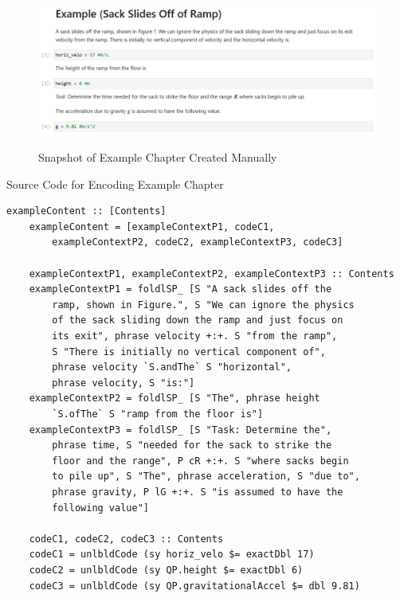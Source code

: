 \begin{figure}[h!]
	\caption{Snapshot of Example Chapter Created Manually}
	\includegraphics[width=1\textwidth]{figures/example_manual.png}
	\label{fig:example_manual}
\end{figure}

\begin{listing}[h!]
	\caption{Source Code for Encoding Example Chapter}
	\label{code:encodeExample}
	\begin{lstlisting}[language=haskell1]
	exampleContent :: [Contents]
	exampleContent = [exampleContextP1, codeC1, 
		exampleContextP2, codeC2, exampleContextP3, codeC3]
		
	exampleContextP1, exampleContextP2, exampleContextP3 :: Contents
	exampleContextP1 = foldlSP_ [S "A sack slides off the
		ramp, shown in Figure.", S "We can ignore the physics 
		of the sack sliding down the ramp and just focus on 
		its exit", phrase velocity +:+. S "from the ramp",
		S "There is initially no vertical component of", 
		phrase velocity `S.andThe` S "horizontal", 
		phrase velocity, S "is:"]
	exampleContextP2 = foldlSP_ [S "The", phrase height 
		`S.ofThe` S "ramp from the floor is"]
	exampleContextP3 = foldlSP_ [S "Task: Determine the", 
		phrase time, S "needed for the sack to strike the 
		floor and the range", P cR +:+. S "where sacks begin 
		to pile up", S "The", phrase acceleration, S "due to", 
		phrase gravity, P lG +:+. S "is assumed to have the 
		following value"]
		
	codeC1, codeC2, codeC3 :: Contents
	codeC1 = unlbldCode (sy horiz_velo $= exactDbl 17)
	codeC2 = unlbldCode (sy QP.height $= exactDbl 6)
	codeC3 = unlbldCode (sy QP.gravitationalAccel $= dbl 9.81)
	\end{lstlisting}
\end{listing}